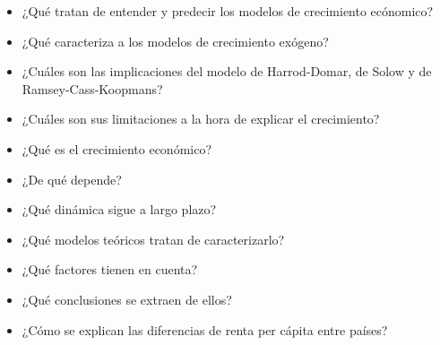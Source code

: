 \documentclass{nuevotema}
\begin{document}

\begin{itemize}
	\item ¿Qué tratan de entender y predecir los modelos de crecimiento ecónomico?
	\item ¿Qué caracteriza a los modelos de crecimiento exógeno?
	\item ¿Cuáles son las implicaciones del modelo de Harrod-Domar, de Solow y de Ramsey-Cass-Koopmans?
	\item ¿Cuáles son sus limitaciones a la hora de explicar el crecimiento?
\end{itemize}

\begin{itemize}
    \item ¿Qué es el crecimiento económico?
    \item ¿De qué depende?
    \item ¿Qué dinámica sigue a largo plazo?
    \item ¿Qué modelos teóricos tratan de caracterizarlo?
    \item ¿Qué factores tienen en cuenta?
    \item ¿Qué conclusiones se extraen de ellos?
    \item ¿Cómo se explican las diferencias de renta per cápita entre países?
\end{itemize}

\esquemacorto
\end{document}
